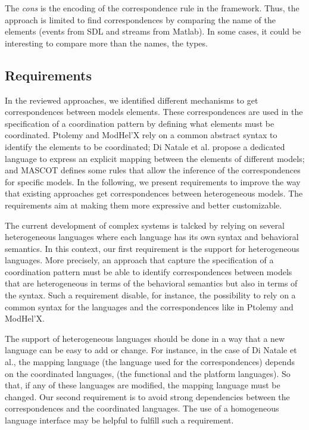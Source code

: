 The \emph{cons} is the encoding of the correspondence rule in the framework. Thus, the approach is limited to find correspondences by comparing the name of the elements (\ie events from SDL and streams from Matlab). In some cases, it could be interesting to compare more than the names, \eg the types. 


\subsection{Requirements}
In the reviewed approaches, we identified different mechanisms to get correspondences between models elements. These correspondences are used in the specification of a coordination pattern by defining what elements must be coordinated. Ptolemy and ModHel'X rely on a common abstract syntax to identify the elements to be coordinated; Di Natale et al. propose a dedicated language to express an explicit mapping between the elements of different models; and MASCOT defines some rules that allow the inference of the correspondences for specific models. In the following, we present requirements to improve the way that existing approaches get correspondences between heterogeneous models. The requirements aim at making them more expressive and better customizable.  

The current development of complex systems is talcked by relying on several heterogeneous languages where each language has its own syntax and behavioral semantics. In this context, our first requirement is the support for heterogeneous languages. More precisely, an approach that capture the specification of a coordination pattern must be able to identify correspondences between models that are heterogeneous in terms of the behavioral semantics but also in terms of the syntax. Such a requirement disable, for instance, the possibility to rely on a common syntax for the languages and the correspondences like in Ptolemy and ModHel'X. 


The support of heterogeneous languages should be done in a way that a new language can be easy to add or change. For instance, in the case of Di Natale et al., the mapping language (\ie the language used for the correspondences) depends on the coordinated languages, (\ie the functional and the platform languages). So that, if any of these languages are modified, the mapping language must be changed. Our second requirement is to avoid strong dependencies between the correspondences and the coordinated languages. The use of a homogeneous language interface may be helpful to fulfill such a requirement.  

